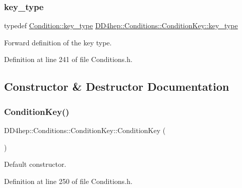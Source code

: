 \subsubsection{\texorpdfstring{key\+\_\+type}{key\_type}}
{\footnotesize\ttfamily typedef \hyperlink{class_d_d4hep_1_1_conditions_1_1_condition_a7528efa762e8cc072ef80ea67c3531f9}{Condition\+::key\+\_\+type} \hyperlink{class_d_d4hep_1_1_conditions_1_1_condition_key_a08bfc8ccb807bdd5e4d9f3b065d1c8f5}{D\+D4hep\+::\+Conditions\+::\+Condition\+Key\+::key\+\_\+type}}



Forward definition of the key type. 



Definition at line 241 of file Conditions.\+h.



\subsection{Constructor \& Destructor Documentation}
\hypertarget{class_d_d4hep_1_1_conditions_1_1_condition_key_a032d6c5ca16bc201fb7166d686a6207a}{}\label{class_d_d4hep_1_1_conditions_1_1_condition_key_a032d6c5ca16bc201fb7166d686a6207a} 
\subsubsection{\texorpdfstring{Condition\+Key()}{ConditionKey()}\hspace{0.1cm}{\footnotesize\ttfamily [1/4]}}
{\footnotesize\ttfamily D\+D4hep\+::\+Conditions\+::\+Condition\+Key\+::\+Condition\+Key (\begin{DoxyParamCaption}{ }\end{DoxyParamCaption})\hspace{0.3cm}{\ttfamily [inline]}}



Default constructor. 



Definition at line 250 of file Conditions.\+h.

\hypertarget{class_d_d4hep_1_1_conditions_1_1_condition_key_a3b476d13ac915f5df91eb33b2b95a552}{}\label{class_d_d4hep_1_1_conditions_1_1_condition_key_a3b476d13ac915f5df91eb33b2b95a552} 
